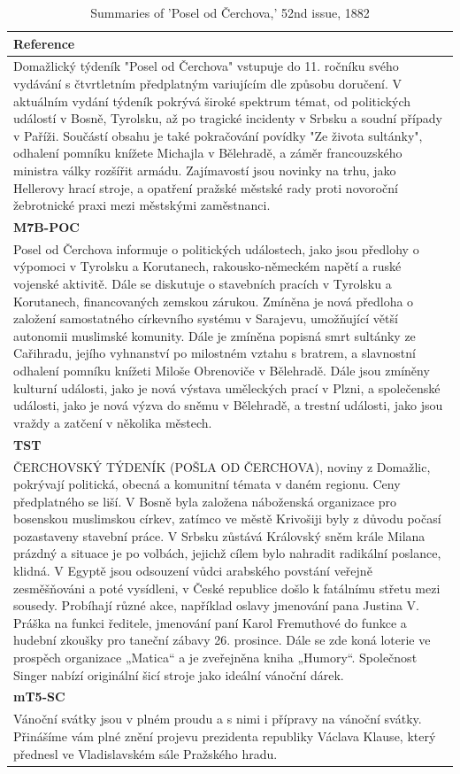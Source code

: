 \documentclass[english, ba, kiv, he, iso690numb, pdf, viewonly]{fasthesis}
\begin{document}
\begin{table}[h!] 
\centering
\caption{Summaries of 'Posel od Čerchova,' 52nd issue, 1882}
\label{eval:tab:example2}
\begin{tabular}{@{}p{}@{}} 
\toprule
\textbf{Reference} \\
\midrule
{\small Domažlický týdeník "Posel od Čerchova" vstupuje do 11. ročníku svého vydávání s čtvrtletním předplatným variujícím dle způsobu doručení. V aktuálním vydání týdeník pokrývá široké spektrum témat, od politických událostí v Bosně, Tyrolsku, až po tragické incidenty v Srbsku a soudní případy v Paříži. Součástí obsahu je také pokračování povídky "Ze života sultánky", odhalení pomníku knížete Michajla v Bělehradě, a záměr francouzského ministra války rozšířit armádu. Zajímavostí jsou novinky na trhu, jako Hellerovy hrací stroje, a opatření pražské městské rady proti novoroční žebrotnické praxi mezi městskými zaměstnanci.} \\
\midrule
\textbf{M7B-POC} \\
{\small Posel od Čerchova informuje o politických událostech, jako jsou předlohy o výpomoci v Tyrolsku a Korutanech, rakousko-německém napětí a ruské vojenské aktivitě. Dále se diskutuje o stavebních pracích v Tyrolsku a Korutanech, financovaných zemskou zárukou. Zmíněna je nová předloha o založení samostatného církevního systému v Sarajevu, umožňující větší autonomii muslimské komunity. Dále je zmíněna popisná smrt sultánky ze Cařihradu, jejího vyhnanství po milostném vztahu s bratrem, a slavnostní odhalení pomníku knížeti Miloše Obrenoviče v Bělehradě. Dále jsou zmíněny kulturní události, jako je nová výstava uměleckých prací v Plzni, a společenské události, jako je nová výzva do sněmu v Bělehradě, a trestní události, jako jsou vraždy a zatčení v několika městech.} \\
\midrule
\textbf{TST} \\
{\small ČERCHOVSKÝ TÝDENÍK (POŠLA OD ČERCHOVA), noviny z Domažlic, pokrývají politická, obecná a komunitní témata v daném regionu. Ceny předplatného se liší. V Bosně byla založena náboženská organizace pro bosenskou muslimskou církev, zatímco ve městě Krivošiji byly z důvodu počasí pozastaveny stavební práce. V Srbsku zůstává Královský sněm krále Milana prázdný a situace je po volbách, jejichž cílem bylo nahradit radikální poslance, klidná. V Egyptě jsou odsouzení vůdci arabského povstání veřejně zesměšňováni a poté vysídleni, v České republice došlo k fatálnímu střetu mezi sousedy. Probíhají různé akce, například oslavy jmenování pana Justina V. Práška na funkci ředitele, jmenování paní Karol Fremuthové do funkce a hudební zkoušky pro taneční zábavy 26. prosince. Dále se zde koná loterie ve prospěch organizace „Matica“ a je zveřejněna kniha „Humory“. Společnost Singer nabízí originální šicí stroje jako ideální vánoční dárek.} \\
\midrule
\textbf{mT5-SC} \\
{\small Vánoční svátky jsou v plném proudu a s nimi i přípravy na vánoční svátky. Přinášíme vám plné znění projevu prezidenta republiky Václava Klause, který přednesl ve Vladislavském sále Pražského hradu.} \\
\bottomrule
\end{tabular}
\end{table}
\end{document}
